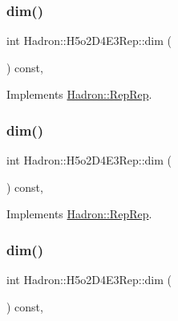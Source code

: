 \subsubsection{\texorpdfstring{dim()}{dim()}\hspace{0.1cm}{\footnotesize\ttfamily [3/5]}}
{\footnotesize\ttfamily int Hadron\+::\+H5o2\+D4\+E3\+Rep\+::dim (\begin{DoxyParamCaption}{ }\end{DoxyParamCaption}) const\hspace{0.3cm}{\ttfamily [inline]}, {\ttfamily [virtual]}}



Implements \mbox{\hyperlink{structHadron_1_1RepRep_a92c8802e5ed7afd7da43ccfd5b7cd92b}{Hadron\+::\+Rep\+Rep}}.

\mbox{\label{structHadron_1_1H5o2D4E3Rep_a581ae4c5439a622f1ae9d8ed2c0acab3}} 
\subsubsection{\texorpdfstring{dim()}{dim()}\hspace{0.1cm}{\footnotesize\ttfamily [4/5]}}
{\footnotesize\ttfamily int Hadron\+::\+H5o2\+D4\+E3\+Rep\+::dim (\begin{DoxyParamCaption}{ }\end{DoxyParamCaption}) const\hspace{0.3cm}{\ttfamily [inline]}, {\ttfamily [virtual]}}



Implements \mbox{\hyperlink{structHadron_1_1RepRep_a92c8802e5ed7afd7da43ccfd5b7cd92b}{Hadron\+::\+Rep\+Rep}}.

\mbox{\label{structHadron_1_1H5o2D4E3Rep_a581ae4c5439a622f1ae9d8ed2c0acab3}} 
\subsubsection{\texorpdfstring{dim()}{dim()}\hspace{0.1cm}{\footnotesize\ttfamily [5/5]}}
{\footnotesize\ttfamily int Hadron\+::\+H5o2\+D4\+E3\+Rep\+::dim (\begin{DoxyParamCaption}{ }\end{DoxyParamCaption}) const\hspace{0.3cm}{\ttfamily [inline]}, {\ttfamily [virtual]}}




